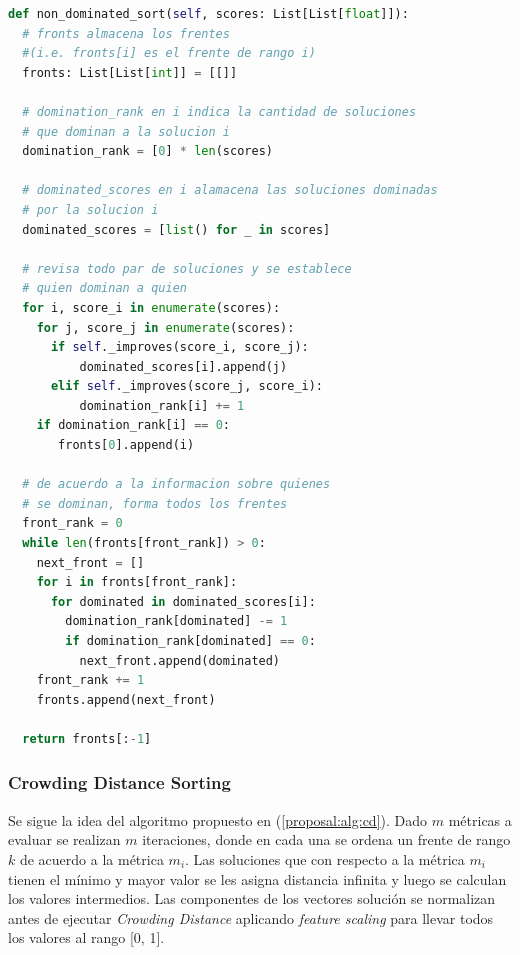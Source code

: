 \begin{lstlisting}[caption=Selecci\'on seg\'un \'indice de dominaci\'on, language=Python]
def non_dominated_sort(self, scores: List[List[float]]):
  # fronts almacena los frentes 
  #(i.e. fronts[i] es el frente de rango i)
  fronts: List[List[int]] = [[]]

  # domination_rank en i indica la cantidad de soluciones
  # que dominan a la solucion i
  domination_rank = [0] * len(scores)

  # dominated_scores en i alamacena las soluciones dominadas
  # por la solucion i
  dominated_scores = [list() for _ in scores]

  # revisa todo par de soluciones y se establece
  # quien dominan a quien
  for i, score_i in enumerate(scores):
    for j, score_j in enumerate(scores):
      if self._improves(score_i, score_j):
          dominated_scores[i].append(j)
      elif self._improves(score_j, score_i):
          domination_rank[i] += 1
    if domination_rank[i] == 0:
       fronts[0].append(i)

  # de acuerdo a la informacion sobre quienes
  # se dominan, forma todos los frentes
  front_rank = 0
  while len(fronts[front_rank]) > 0:
    next_front = []
    for i in fronts[front_rank]:
      for dominated in dominated_scores[i]:
        domination_rank[dominated] -= 1
        if domination_rank[dominated] == 0:
          next_front.append(dominated)
    front_rank += 1
    fronts.append(next_front)

  return fronts[:-1]
\end{lstlisting}

\subsubsection{Crowding Distance Sorting}
Se sigue la idea del algoritmo propuesto en (\ref{proposal:alg:cd}). Dado $m$ m\'etricas a evaluar se realizan $m$ iteraciones, donde en cada una se ordena un frente de rango $k$ de acuerdo a la m\'etrica $m_i$. Las soluciones que con respecto a la m\'etrica $m_i$ tienen el m\'inimo y mayor valor se les asigna distancia infinita y luego se calculan los valores intermedios. Las componentes de los vectores soluci\'on se normalizan antes de ejecutar \textit{Crowding Distance} aplicando \textit{feature scaling} para llevar todos los valores al rango [0, 1].


